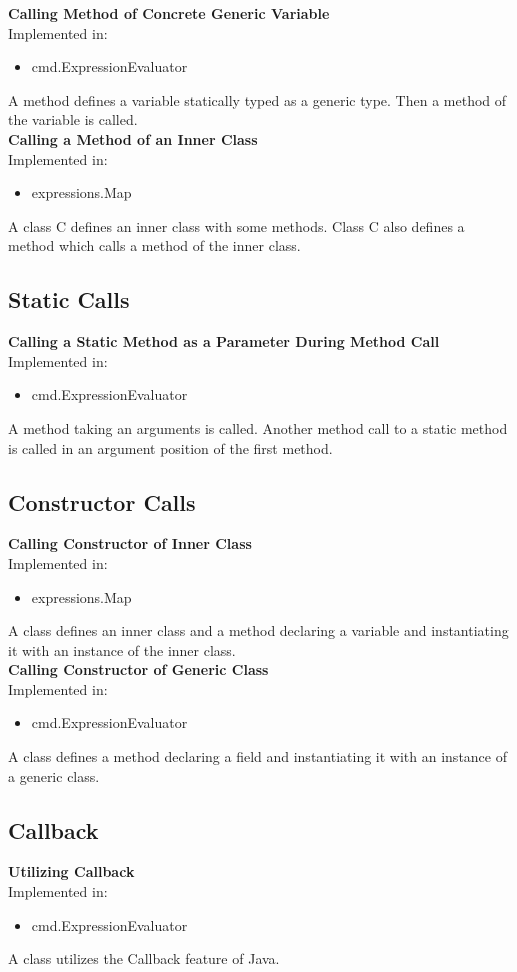 \documentclass{article}
\begin{document}
\noindent
\textbf{Calling Method of Concrete Generic Variable}\\
Implemented in: 
\begin{itemize}
    \item cmd.ExpressionEvaluator
\end{itemize}
A method defines a variable statically typed as a generic type. Then a method of the variable is called.\\

\noindent
\textbf{Calling a Method of an Inner Class}\\
Implemented in: 
\begin{itemize}
    \item expressions.Map
\end{itemize}
A class C defines an inner class with some methods. Class C also defines a method which calls a method of the inner class.\\

\subsection{Static Calls}

\textbf{Calling a Static Method as a Parameter During Method Call}\\
Implemented in: 
\begin{itemize}
    \item cmd.ExpressionEvaluator
\end{itemize}
A method taking an arguments is called. Another method call to a static method is called in an argument position of the first method.\\

\subsection{Constructor Calls}

\textbf{Calling Constructor of Inner Class}\\
Implemented in: 
\begin{itemize}
    \item expressions.Map
\end{itemize}
A class defines an inner class and a method declaring a variable and instantiating it with an instance of the inner class.\\

\noindent
\textbf{Calling Constructor of Generic Class}\\
Implemented in: 
\begin{itemize}
    \item cmd.ExpressionEvaluator
\end{itemize}
A class defines a method declaring a field and instantiating it with an instance of a generic class.\\


\subsection{Callback}

\textbf{Utilizing Callback}\\
Implemented in: 
\begin{itemize}
    \item cmd.ExpressionEvaluator
\end{itemize}
A class utilizes the Callback feature of Java.\\
\end{document}
